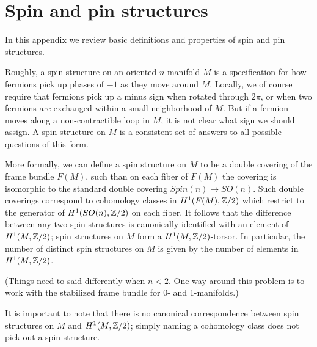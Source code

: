 

\section{Spin and pin structures} \label{spin_and_pin}



In this appendix we review basic definitions and properties of spin and pin structures.

\medskip

Roughly, a spin structure on an oriented $n$-manifold $M$ is a specification for how fermions pick up phases of $-1$ as they move around $M$.
Locally, we of course require that fermions pick up a minus sign when rotated through $2\pi$,
or when two fermions are exchanged within a small neighborhood of $M$.
But if a fermion moves along a non-contractible loop in $M$, it is not clear what sign we should assign.
A spin structure on $M$ is a consistent set of answers to all possible questions of this form.

More formally, we can define a spin structure on $M$ to be a double covering of the frame bundle $F(M)$, such than on each fiber of $F(M)$
the covering is isomorphic to the standard double covering $Spin(n) \to SO(n)$.
Such double coverings correspond to cohomology classes in $H^1(F(M), \mathbb{Z}/2)$ which restrict to the generator of $H^1(SO(n), \mathbb{Z}/2)$ on each fiber.
It follows that the difference between any two spin structures is canonically identified
with an element of $H^1(M, \mathbb{Z}/2)$; spin structures on $M$ form a $H^1(M, \mathbb{Z}/2)$-torsor.
In particular, the number of distinct spin structures on $M$ is given by the number of elements in $H^1(M, \mathbb{Z}/2)$.

(Things need to said differently when $n<2$.
One way around this problem is to work with the stabilized frame bundle for 0- and 1-manifolds.)

It is important to note that there is no canonical correspondence between spin structures on $M$ and $H^1(M, \mathbb{Z}/2)$; simply naming
a cohomology class does not pick out a spin structure.

